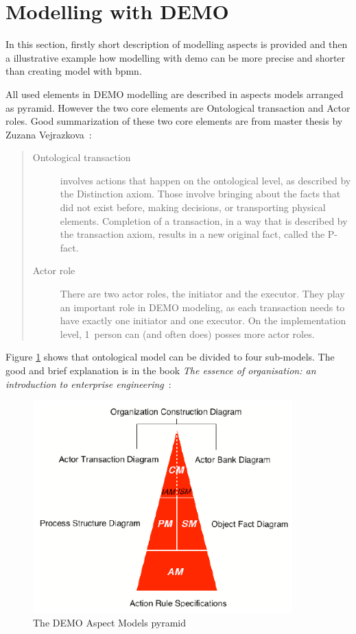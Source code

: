 \begin{quotation}
\end{quotation}

\section{Modelling with DEMO}
In this section, firstly short description of modelling aspects is provided and then a illustrative example how modelling with \gls{demo} can be more precise and shorter than creating model with \gls{bpmn}. 

All used elements in DEMO modelling are described in aspects models arranged as pyramid. However the two core elements are Ontological transaction and Actor roles. Good summarization of these two core elements are from master thesis by Zuzana Vejrazkova~\cite{vejrazkova-demo-2013}:

\begin{quote}
	\begin{description}
		\item[Ontological transaction] involves actions that happen on the ontological level, as described by the Distinction axiom. Those involve bringing about the facts that did not exist before, making decisions, or transporting physical elements. Completion of a transaction, in a way that is described by the transaction axiom, results in a new original fact, called the P-fact.
        \item[Actor role] There are two actor roles, the initiator and the executor. They play an important role in DEMO modeling, as each transaction needs to have exactly one initiator and one executor. On the implementation level, 1~person can (and often does) posses more actor roles.
	\end{description}
\end{quote}

Figure \ref{fig:DemoAspectModels} shows that ontological model can be divided to four sub-models. The good and brief explanation is in the book \textit{The essence of organisation: an introduction to enterprise engineering}~\cite{perinforma-essence-2015}:

\begin{figure}[ht!]
	\centering
    \includegraphics[width=10cm, keepaspectratio]{img/DemoAspectModels}
    \caption{The DEMO Aspect Models pyramid}
    \label{fig:DemoAspectModels}
\end{figure}


